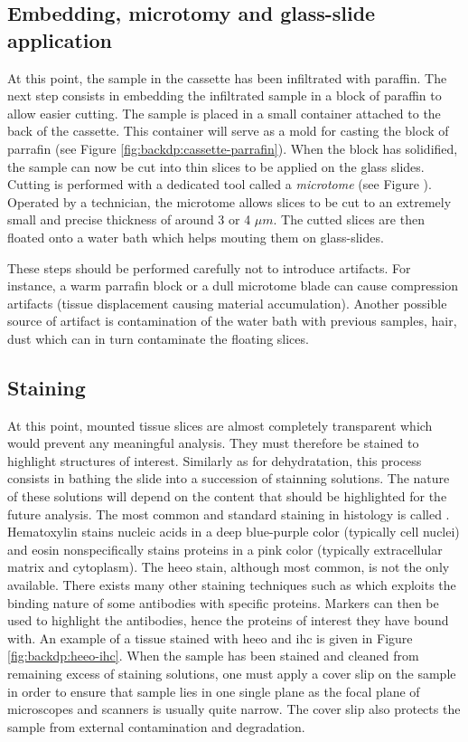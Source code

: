 \subsection{Embedding, microtomy and glass-slide application}
\label{ssec:backdp:embedding}

At this point, the sample in the cassette has been infiltrated with paraffin. The next step consists in embedding the infiltrated sample in a block of paraffin to allow easier cutting. The sample is placed in a small container attached to the back of the cassette. This container will serve as a mold for casting the block of parrafin (see Figure \ref{fig:backdp:cassette-parrafin}). When the block has solidified, the sample can now be cut into thin slices to be applied on the glass slides. Cutting is performed with a dedicated tool called a \textit{microtome} (see Figure ). Operated by a technician, the microtome allows slices to be cut to an extremely small and precise thickness of around 3 or 4 $\mu m$. The cutted slices are then floated onto a water bath which helps mouting them on glass-slides. 

These steps should be performed carefully not to introduce artifacts. For instance, a warm parrafin block or a dull microtome blade can cause compression artifacts (\ie tissue displacement causing material accumulation). Another possible source of artifact is contamination of the water bath with previous samples, hair, dust which can in turn contaminate the floating slices.   

\subsection{Staining}
\label{ssec:backdp:staining}
At this point, mounted tissue slices are almost completely transparent which would prevent any meaningful analysis. They must therefore be stained to highlight structures of interest. Similarly as for dehydratation, this process consists in bathing the slide into a succession of stainning solutions. The nature of these solutions will depend on the content that should be highlighted for the future analysis. The most common and standard staining in histology is called . Hematoxylin stains nucleic acids in a deep blue-purple color (typically cell nuclei) and eosin nonspecifically stains proteins in a pink color (typically extracellular matrix and cytoplasm). The \acrshort{heeo} stain, although most common, is not the only available. There exists many other staining techniques such as  which exploits the binding nature of some antibodies with specific proteins. Markers can then be used to highlight the antibodies, hence the proteins of interest they have bound with. An example of a tissue stained with \acrshort{heeo} and \acrshort{ihc} is given in Figure \ref{fig:backdp:heeo-ihc}. When the sample has been stained and cleaned from remaining excess of staining solutions, one must apply a cover slip on the sample in order to ensure that sample lies in one single plane as the focal plane of microscopes and scanners is usually quite narrow. The cover slip also protects the sample from external contamination and degradation. 

